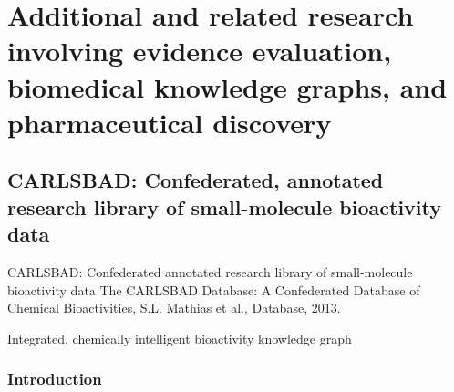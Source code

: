 \chapter{Additional and related research involving evidence evaluation, biomedical knowledge graphs, and pharmaceutical discovery}

\section{CARLSBAD: Confederated, annotated research library of small-molecule bioactivity data}

CARLSBAD: Confederated annotated research library of small-molecule bioactivity data
The CARLSBAD Database: A Confederated Database of Chemical Bioactivities, S.L. Mathias et al., Database, 2013\cite{Mathias2013-hj}.

Integrated, chemically intelligent bioactivity knowledge graph

\subsection{Introduction}

